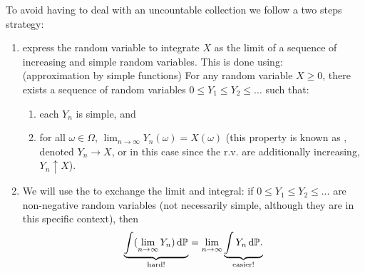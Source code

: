 \documentclass{article}
\begin{document}
To avoid having to deal with an uncountable collection we follow a two steps strategy:
\begin{enumerate}
  \item express the random variable to integrate $X$ as the limit of a sequence of increasing and simple random variables. This is done using: \\ (approximation by simple functions) For any random variable $X \ge 0$, there exists a sequence of random variables $0 \le Y_1 \le Y_2 \le \dots$ such that:
   \begin{enumerate}
     \item each $Y_n$ is simple, and
     \item for all $\omega \in \Omega$, $\lim_{n\to\infty} Y_n(\omega) = X(\omega)$ (this property is known as , denoted $Y_n \to X$, or in this case since the r.v. are additionally increasing, $Y_n \uparrow X$).
   \end{enumerate}
  \item We will use the  to exchange the limit and integral: if $0 \le Y_1 \le Y_2 \le \dots$ are non-negative random variables (not necessarily simple, although they are in this specific context), then 
\[ \underbrace{ \int (\lim_{n\to\infty} Y_n) \,\mathrm{d} {\mathbb P}}_{\text{hard!}} = \lim_{n\to\infty} \underbrace{\int Y_n \,\mathrm{d} {\mathbb P}.}_{\text{easier!}} \]
\end{enumerate}
\end{document}
